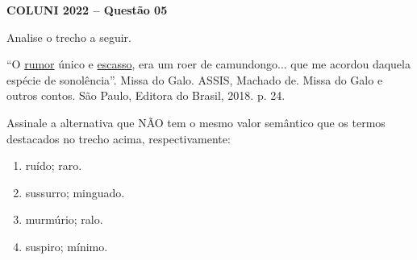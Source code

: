 \textbf{COLUNI 2022 -- Questão 05}\par\medskip Analise o trecho a seguir.

\par

“O \underline{rumor} único e \underline{escasso}, era um roer de camundongo... que me acordou daquela espécie de sonolência”. Missa do Galo. ASSIS, Machado de. Missa do Galo e outros contos. São Paulo, Editora do Brasil, 2018. p. 24.

\par

Assinale a alternativa que NÃO tem o mesmo valor semântico que os termos destacados no trecho acima, respectivamente:\begin{enumerate}
\item ruído; raro.
\item sussurro; minguado.
\item murmúrio; ralo.
\item suspiro; mínimo.\end{enumerate}
